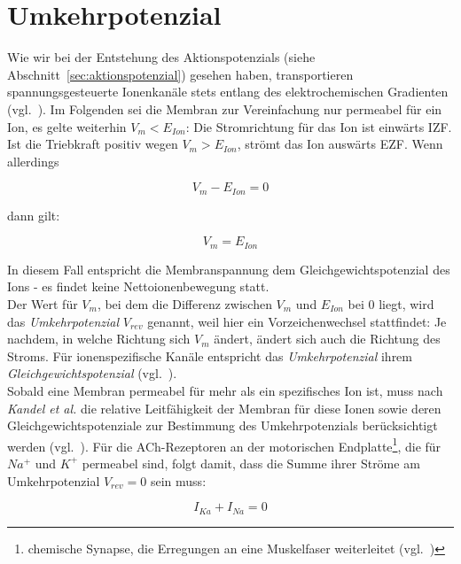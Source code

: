 {\section{Umkehrpotenzial}\label{appendix:umkehrpotenzial}
Wie wir bei der Entstehung des Aktionspotenzials (siehe Abschnitt~\ref{sec:aktionspotenzial}) gesehen haben, transportieren spannungsgesteuerte Ionenkanäle stets entlang des elektrochemischen Gradienten (vgl.~\cite[39]{Fak19}).
Im Folgenden sei die Membran zur Vereinfachung nur permeabel für ein Ion, es gelte weiterhin $V_m < E_{Ion}$: Die Stromrichtung für das Ion ist einwärts IZF. Ist die Triebkraft positiv wegen $V_m > E_{Ion}$, strömt das Ion auswärts EZF. Wenn allerdings

\begin{equation}
    V_m - E_{Ion} = 0
\end{equation}

dann gilt:

\begin{equation}
    V_m = E_{Ion}
\end{equation}

In diesem Fall entspricht die Membranspannung dem Gleichgewichtspotenzial des Ions - es findet keine Nettoionenbewegung statt.\\

Der Wert für $V_m$, bei dem die Differenz zwischen $V_m$ und $E_{Ion}$ bei $0$ liegt, wird das \textit{Umkehrpotenzial} $V_{rev}$ genannt, weil hier ein Vorzeichenwechsel stattfindet: Je nachdem, in welche Richtung sich $V_m$ ändert, ändert sich auch die Richtung des Stroms.
Für ionenspezifische Kanäle entspricht das \textit{Umkehrpotenzial} ihrem \textit{Gleichgewichtspotenzial} (vgl.~\cite[95 f.]{SBB+13}).\\

Sobald eine Membran permeabel für mehr als ein spezifisches Ion ist, muss nach \textit{Kandel et al.} die relative Leitfähigkeit der Membran für diese Ionen sowie deren Gleichgewichtspotenziale zur Bestimmung des Umkehrpotenzials berücksichtigt werden (vgl.~\cite[196, Box 9--1]{KSJ+13}).
Für die ACh-Rezeptoren an der motorischen Endplatte\footnote{
    chemische Synapse, die Erregungen an eine Muskelfaser weiterleitet (vgl.~\cite[56]{SD07})
}, die für $Na^+$ und $K^+$ permeabel sind, folgt damit, dass die Summe ihrer Ströme am Umkehrpotenzial $V_{rev} = 0$ sein muss:

\begin{equation}
    I_{Ka} + I_{Na} = 0
\end{equation}

}
